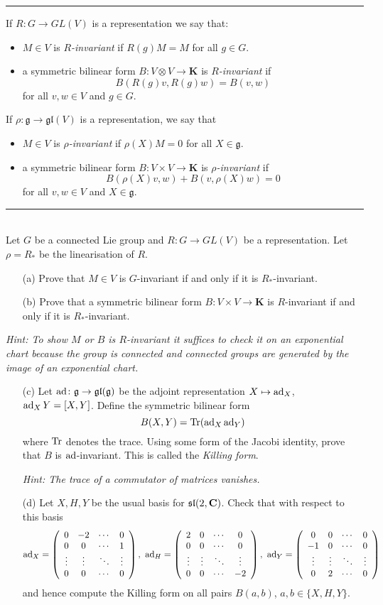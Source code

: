 \documentclass[12pt]{article}
\begin{document}
\newpage

\bigskip
\hrule
\bigskip
If $R\colon G\to GL(V)$ is a representation we say that:
\begin{itemize}
\item $M\in V$ is {\em $R$-invariant} if $R(g)M=M$ for all $g\in G$.
\item a symmetric bilinear form $B\colon V\otimes V\to\mathbf{K}$ is {\em $R$-invariant} if
\[B(R(g)v,R(g)w)=B(v,w)\]
for all $v,w\in V$ and $g\in G$.
\end{itemize}

If $\rho\colon\mathfrak{g}\to\mathfrak{gl}(V)$ is a representation, we say that
\begin{itemize}
\item $M\in V$ is {\em $\rho$-invariant} if $\rho(X)M=0$ for all $X\in\mathfrak{g}$.
\item a symmetric bilinear form $B\colon V\times V\to\mathbf{K}$ is {\em $\rho$-invariant} if
\[B(\rho(X)v,w)+B(v,\rho(X)w)=0\]
for all $v,w\in V$ and $X\in\mathfrak{g}$.
\end{itemize}
\bigskip
\hrule
\bigskip

\begin{question}\ \\
Let $G$ be a connected Lie group and $R\colon G\to GL(V)$ be a representation. Let $\rho=R_*$ be the linearisation of $R$.

\begin{enumerate}
\item[(a)] Prove that $M\in V$ is $G$-invariant if and only if it is $R_*$-invariant.
\item[(b)] Prove that a symmetric bilinear form $B\colon V\times V\to\mathbf{K}$ is $R$-invariant if and only if it is $R_*$-invariant.
\end{enumerate}

{\em Hint: To show $M$ or $B$ is $R$-invariant it suffices to check it on an exponential chart because the group is connected and connected groups are generated by the image of an exponential chart.}

\begin{enumerate}
\item[(c)] Let $\operatorname{ad}\colon\mathfrak{g}\to\mathfrak{gl}(\mathfrak{g})$ be the adjoint representation $X\mapsto\operatorname{ad}_X$, $\operatorname{ad}_XY=[X,Y]$. Define the symmetric bilinear form
\[B(X,Y)=\operatorname{Tr}(\operatorname{ad}_X\operatorname{ad}_Y)\]
where $\operatorname{Tr}$ denotes the trace. Using some form of the Jacobi identity, prove that $B$ is $\operatorname{ad}$-invariant. This is called the {\em Killing form}.

{\em Hint: The trace of a commutator of matrices vanishes.}
\item[(d)] Let $X,H,Y$ be the usual basis for $\mathfrak{sl}(2,\mathbf{C})$. Check that with respect to this basis
\[\OP{ad}_X=\MATR{0}{-2}{0}{0}{0}{1}{0}{0}{0},\ \OP{ad}_H=\MATR{2}{0}{0}{0}{0}{0}{0}{0}{-2},\ \OP{ad}_Y=\MATR{0}{0}{0}{-1}{0}{0}{0}{2}{0}\]
and hence compute the Killing form on all pairs $B(a,b)$, $a,b\in\{X,H,Y\}$.
\end{enumerate}
\end{question}
\end{document}
